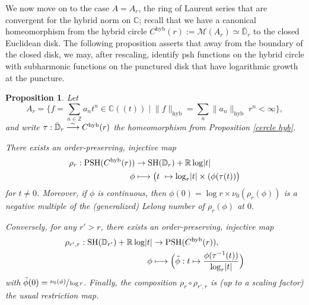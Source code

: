 \documentclass[JEP,XML,SOM,Unicode,published]{cedram}
\newcommand\mto{\mathchoice{\longmapsto}{\mapsto}{\mapsto}{\mapsto}}
\newcommand{\To}[1]{\mathchoice{\xrightarrow{\textstyle\kern4pt#1\kern3pt}}{\stackrel{#1}{\longrightarrow}}{}{}}
\let\ts\textstyle
\let\sep\mid
\newcommand{\lpr}{(\!(}
\newcommand{\rpr}{)\!)}
\newtheorem{prop}[equation]{Proposition}
\theoremstyle{definition}
\newcommand \C{\mathbb C}
\newcommand \D {\mathbb{D}}
\newcommand \R{\mathbb R}
\newcommand \Z{\mathbb Z}
\newcommand \M {\mathscr {M}}
\newcommand{\hyb}{\mathrm{hyb}}
\DeclareMathOperator{\PSH}{PSH}
\DeclareMathOperator{\SH}{SH}
\begin{document}
We now move on to the case $A=A_r$, the ring of Laurent series that are convergent for the hybrid norm on $\C$; recall that we have a canonical homeomorphism from the hybrid circle $C^{\hyb}(r):=\M(A_r) \simeq \bar{\D}_r$ to the closed Euclidean disk. The following proposition asserts that away from the boundary of the closed disk, we may, after rescaling, identify psh functions on the hybrid circle with subharmonic functions on the punctured disk that have logarithmic growth at the puncture.
\begin{prop}
Let
\[\ts
A_r = \bigl\{ f = \sum_{n \in \Z} a_n t^n \in \C\lpr t\rpr \sep \lVert f \rVert_{\hyb} = \sum_{n} \lVert a_n \rVert_{\hyb} \; r^n < \infty \bigl\},
\]
and write $\tau: \bar{\D}_r \To{\sim} C^{\hyb}(r)$ the homeomorphism from Proposition \ref{cercle hyb}.

There exists an order-preserving, injective map
\begin{align*}
\rho_r: \PSH(C^{\hyb}(r)) &\to \SH(\D_r) + \R \log \lvert t \rvert\\
\phi &\mto \bigl(t \mapsto \log_r \lvert t \rvert \times (\phi (\tau(t)) \bigr)
\end{align*}
for $t \neq 0$. Moreover, if $\phi$ is continuous, then $\phi(0) = \log r \times \nu_0(\rho_r(\phi))$ is a negative multiple of the (generalized) Lelong number of $\rho_r(\phi)$ at $0$.

Conversely, for any $r'>r$, there exists an order-preserving, injective map
\begin{align*}
\rho_{r', r}: \SH(\D_{r'}) + \R \log \lvert t \rvert &\to \PSH(C^{\hyb}(r)),
\\
\phi &\mto \Bigl(\tilde{\phi}: t \mapsto \frac{\phi(\tau^{-1}(t))}{\log_r \lvert t \rvert} \Bigr)
\end{align*}
with $\tilde{\phi}(0) = \sfrac{\nu_{0}(\phi)}{\log r}$.
Finally, the composition $\rho_r \circ \rho_{r', r}$ is (up to a scaling factor) the usual restriction map.
\end{prop}
\end{document}
